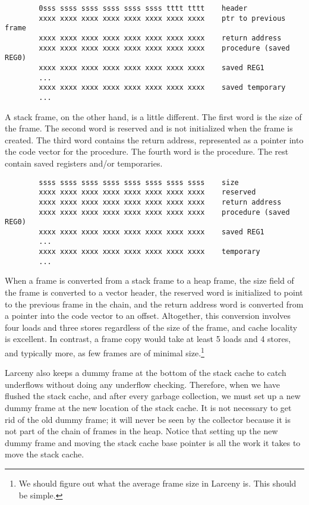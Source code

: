 \begin{minipage}{\linewidth}
\begin{verbatim}
        0sss ssss ssss ssss ssss ssss tttt tttt    header
        xxxx xxxx xxxx xxxx xxxx xxxx xxxx xxxx    ptr to previous frame
        xxxx xxxx xxxx xxxx xxxx xxxx xxxx xxxx    return address
        xxxx xxxx xxxx xxxx xxxx xxxx xxxx xxxx    procedure (saved REG0)
        xxxx xxxx xxxx xxxx xxxx xxxx xxxx xxxx    saved REG1
        ...
        xxxx xxxx xxxx xxxx xxxx xxxx xxxx xxxx    saved temporary
        ...
\end{verbatim}
\end{minipage}

A stack frame, on the other hand, is a little different. The first word is
the size of the frame. The second word is reserved and is not initialized
when the frame is created. The third word contains the return address,
represented as a pointer into the code vector for the procedure. The fourth
word is the procedure. The rest contain saved registers and/or temporaries.

\begin{minipage}{\linewidth}
\begin{verbatim}
        ssss ssss ssss ssss ssss ssss ssss ssss    size
        xxxx xxxx xxxx xxxx xxxx xxxx xxxx xxxx    reserved
        xxxx xxxx xxxx xxxx xxxx xxxx xxxx xxxx    return address
        xxxx xxxx xxxx xxxx xxxx xxxx xxxx xxxx    procedure (saved REG0)
        xxxx xxxx xxxx xxxx xxxx xxxx xxxx xxxx    saved REG1
        ...
        xxxx xxxx xxxx xxxx xxxx xxxx xxxx xxxx    temporary
        ...
\end{verbatim}
\end{minipage}

When a frame is converted from a stack frame to a heap frame, the size field
of the frame is converted to a vector header, the reserved word is
initialized to point to the previous frame in the chain, and the return
address word is converted from a pointer into the code vector to an offset.
Altogether, this conversion involves four loads and three stores regardless
of the size of the frame, and cache locality is excellent. In contrast, a
frame copy would take at least 5 loads and 4 stores, and typically more, as
few frames are of minimal size.\footnote{We should figure out what the
average frame size in Larceny is. This should be simple.}

Larceny also keeps a dummy frame at the bottom of the stack cache to catch
underflows without doing any underflow checking. Therefore, when we have
flushed the stack cache, and after every garbage collection, we must set up
a new dummy frame at the new location of the stack cache. It is not
necessary to get rid of the old dummy frame; it will never be seen by the
collector because it is not part of the chain of frames in the heap. Notice
that setting up the new dummy frame and moving the stack cache base pointer
is all the work it takes to move the stack cache.

